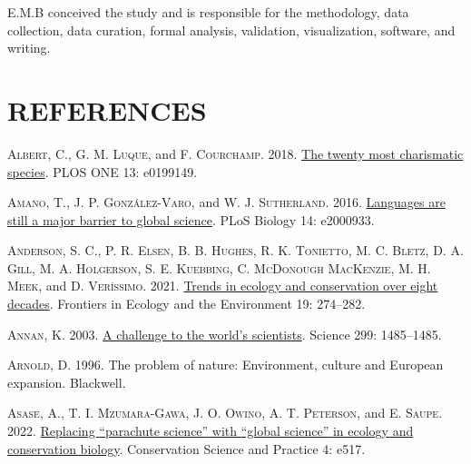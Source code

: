 \documentclass[
  12pt,
  man, donotrepeattitle,floatsintext]{apa6}
\newlength{\cslhangindent}
\newlength{\cslentryspacingunit} %
\newenvironment{CSLReferences}[2] %
 {%
  \setlength{\parindent}{0pt}
  \ifodd #1
  \let\oldpar\par
  \def\par{\hangindent=\cslhangindent\oldpar}
  \fi
  \setlength{\parskip}{#2\cslentryspacingunit}
 }%
 {}
\begin{document}
E.M.B conceived the study and is responsible for the methodology, data collection, data curation, formal analysis, validation, visualization, software, and writing.

\newpage

\hypertarget{references}{%
\section{REFERENCES}\label{references}}

\hypertarget{refs}{}
\begin{CSLReferences}{1}{0}
\leavevmode{}%
\textsc{Albert, C.}, \textsc{G. M. Luque}, and \textsc{F. Courchamp}. 2018. \href{https://doi.org/10.1371/journal.pone.0199149}{The twenty most charismatic species}. PLOS ONE 13: e0199149.

\leavevmode{}%
\textsc{Amano, T.}, \textsc{J. P. González-Varo}, and \textsc{W. J. Sutherland}. 2016. \href{https://doi.org/10.1371/journal.pbio.2000933}{Languages are still a major barrier to global science}. PLoS Biology 14: e2000933.

\leavevmode{}%
\textsc{Anderson, S. C.}, \textsc{P. R. Elsen}, \textsc{B. B. Hughes}, \textsc{R. K. Tonietto}, \textsc{M. C. Bletz}, \textsc{D. A. Gill}, \textsc{M. A. Holgerson}, \textsc{S. E. Kuebbing}, \textsc{C. McDonough MacKenzie}, \textsc{M. H. Meek}, and \textsc{D. Veríssimo}. 2021. \href{https://doi.org/10.1002/fee.2320}{Trends in ecology and conservation over eight decades}. Frontiers in Ecology and the Environment 19: 274--282.

\leavevmode{}%
\textsc{Annan, K.} 2003. \href{https://doi.org/10.1126/science.299.5612.1485}{A challenge to the world's scientists}. Science 299: 1485--1485.

\leavevmode{}%
\textsc{Arnold, D.} 1996. The problem of nature: {Environment}, culture and {European} expansion. Blackwell.

\leavevmode{}%
\textsc{Asase, A.}, \textsc{T. I. Mzumara-Gawa}, \textsc{J. O. Owino}, \textsc{A. T. Peterson}, and \textsc{E. Saupe}. 2022. \href{https://doi.org/10.1111/csp2.517}{Replacing {``parachute science''} with {``global science''} in ecology and conservation biology}. Conservation Science and Practice 4: e517.


\end{CSLReferences}
\end{document}

